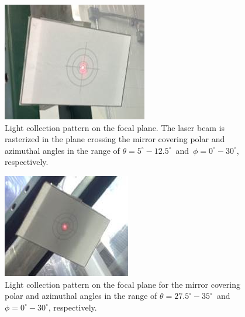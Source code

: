 \begin{figure}[ht]
    \centering
    \includegraphics[width=0.90\linewidth]{images/Focal_Plane_4.jpg}
    \caption{Light collection pattern on the focal plane. The laser beam is rasterized in the plane crossing the
      mirror covering polar and azimuthal angles in the range of $\theta = 5^\circ - 12.5^\circ$\, and\,
      $\phi = 0^\circ - 30^\circ$, respectively.}
    \label{fig:Focal_Plane_4}
\end{figure}

\begin{figure}[ht]
    \centering
    \includegraphics[width=0.95\linewidth]{images/Focal_Plane_1R.jpg}
    \caption{Light collection pattern on the focal plane for the mirror covering polar and azimuthal angles in
      the range of $\theta = 27.5^\circ - 35^\circ$\, and\, $\phi = 0^\circ - 30^\circ$, respectively.}
    \label{fig:Focal_Plane_1R}
\end{figure}

